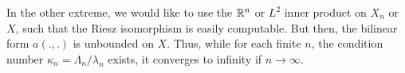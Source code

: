 \begin{example}
  In the other extreme, we would like to use the $\mathbb R^n$ or $L^2$
  inner product on $X_n$ or $X$, such that the Riesz isomorphism is
  easily computable. But then, the bilinear form $a(.,.)$ is unbounded
  on $X$. Thus, while for each finite $n$, the condition number
  $\kappa_n = \Lambda_n/\lambda_n$ exists, it converges to infinity if
  $n\to\infty$.
\end{example}

